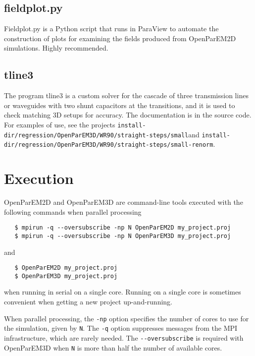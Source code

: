 \documentclass[titlepage]{article}
\renewcommand\_{\textunderscore\linebreak[1]}
\begin{document}
\subsection{field\_plot.py}
\label{sec:2Dplots}

Field\_plot.py is a Python script that runs in ParaView to automate the construction of plots for examining the fields produced from OpenParEM2D simulations.  Highly recommended.

\subsection{tline3}

The program tline3 is a custom solver for the cascade of three transmission lines or waveguides with two shunt capacitors at the transitions, and it is used to check matching 3D setups for accuracy.  The documentation is in the source code.  For examples of use, see the projects \newline\verb+install-dir/regression/OpenParEM3D/WR90/straight-steps/small+\newline and \newline \verb+install-dir/regression/OpenParEM3D/WR90/straight-steps/small-renorm+.

\section{Execution}

OpenParEM2D and OpenParEM3D are command-line tools executed with the following commands when parallel processing
\begin{verbatim}
   $ mpirun -q --oversubscribe -np N OpenParEM2D my_project.proj 
   $ mpirun -q --oversubscribe -np N OpenParEM3D my_project.proj 
\end{verbatim}
and 
\begin{verbatim}
   $ OpenParEM2D my_project.proj
   $ OpenParEM3D my_project.proj
\end{verbatim}
when running in serial on a single core.  Running on a single core is sometimes convenient when getting a new project up-and-running.

When parallel processing, the \verb+-np+ option specifies the number of cores to use for the simulation, given by \verb+N+.  The \verb+-q+ option suppresses messages from the MPI infrastructure, which are rarely needed.  The \verb+--oversubscribe+ is required with OpenParEM3D when \verb+N+ is more than half the number of available cores.  
\end{document}
